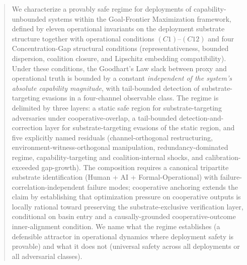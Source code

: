 \begin{abstract}
We characterize a provably safe regime for deployments of
capability-unbounded systems within the Goal-Frontier Maximization
framework, defined by eleven operational invariants on the
deployment substrate structure together with operational
conditions $(C1)$--$(C12)$ and four Concentration-Gap structural
conditions (representativeness, bounded dispersion, coalition
closure, and Lipschitz embedding compatibility). Under these
conditions, the Goodhart's Law slack between proxy and
operational truth is bounded by a constant
\emph{independent of the system's absolute capability magnitude},
with tail-bounded detection of substrate-targeting evasions in a
four-channel observable class. The regime is delimited by three layers: a static safe region for
substrate-targeting adversaries under cooperative-overlap, a
tail-bounded detection-and-correction layer for substrate-targeting
evasions of the static region, and five explicitly named residuals
(channel-orthogonal restructuring, environment-witness-orthogonal
manipulation, redundancy-dominated regime, capability-targeting and
coalition-internal shocks, and calibration-exceeded gap-growth). The composition
requires a canonical tripartite substrate identification (Human + AI
+ Formal-Operational) with failure-correlation-independent failure
modes; cooperative anchoring extends the claim by establishing that
optimization pressure on cooperative outputs is locally rational
toward preserving the substrate-exclusive verification layer,
conditional on basin entry and a causally-grounded
cooperative-outcome inner-alignment condition. We name what the
regime establishes (a defensible attractor in operational dynamics
where deployment safety is provable) and what it does not (universal
safety across all deployments or all adversarial classes).
\end{abstract}
